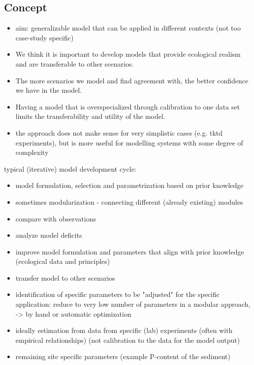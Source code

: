 \documentclass [english,11pt]{article} %
\begin{document}
%
\subsection*{Concept}

\begin{itemize}
\item aim: generalizable model that can be applied in different contexts (not too case-study specific)
\item We think it is important to develop models that provide ecological realism and are transferable to other scenarios.
\item The more scenarios we model and find agreement with, the better confidence we have in the model.  
\item Having a model that is overspecialized through calibration to one data set limits the transferability and utility of the model.
\item the approach does not make sense for very simplistic cases (e.g. tktd experiments), but is more useful for modelling systems with some degree of complexity
\end{itemize}

typical (iterative) model development cycle:
\begin{itemize}
\item model formulation, selection and parametrization based on prior knowledge 
\item sometimes modularization - connecting different (already existing) modules 
\item compare with observations
\item analyze model deficits
\item improve model formulation and parameters that align with prior knowledge (ecological data and principles)
\item transfer model to other scenarios 
\item identification of specific parameters to be "adjusted" for the specific application: reduce to very low number of parameters in a modular approach, -> by hand or automatic optimization
\item ideally estimation from data from specific (lab) experiments (often with empirical relationships) (not calibration to the data for the model output)
\item remaining site specific parameters (example P-content of the sediment)
\end{itemize}
\end{document}
